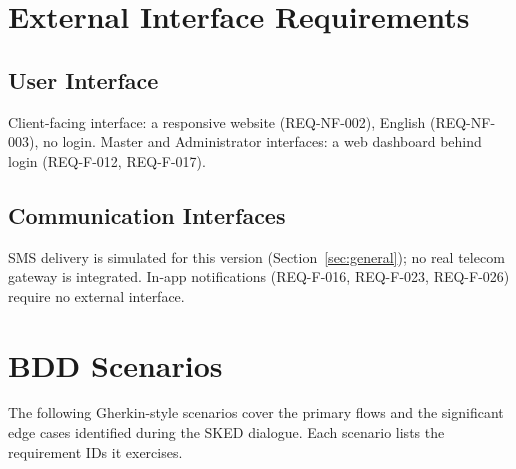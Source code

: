 \documentclass[11pt,a4paper]{article}
\begin{document}
\section{External Interface Requirements}

\subsection{User Interface}

Client-facing interface: a responsive website (REQ-NF-002), English
(REQ-NF-003), no login. Master and Administrator interfaces: a web
dashboard behind login (REQ-F-012, REQ-F-017).

\subsection{Communication Interfaces}

SMS delivery is simulated for this version (Section~\ref{sec:general});
no real telecom gateway is integrated. In-app notifications
(REQ-F-016, REQ-F-023, REQ-F-026) require no external interface.

\section{BDD Scenarios}
\label{sec:bdd}

The following Gherkin-style scenarios cover the primary flows and the
significant edge cases identified during the SKED dialogue. Each scenario
lists the requirement IDs it exercises.
\end{document}
